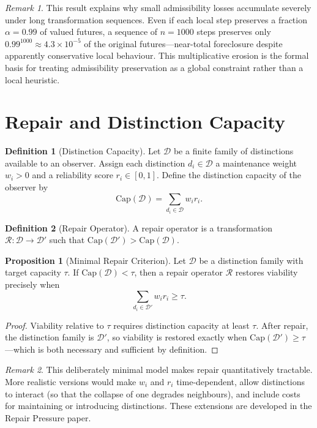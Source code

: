 \documentclass[11pt, oneside]{book}
\theoremstyle{definition}
\newtheorem{definition}{Definition}[chapter]
\newtheorem{proposition}{Proposition}[chapter]
\theoremstyle{remark}
\newtheorem{remark}{Remark}[chapter]
\begin{document}
\begin{remark}
This result explains why small admissibility losses accumulate severely under long transformation sequences. Even if each local step preserves a fraction $\alpha = 0.99$ of valued futures, a sequence of $n = 1000$ steps preserves only $0.99^{1000} \approx 4.3\times 10^{-5}$ of the original futures---near-total foreclosure despite apparently conservative local behaviour. This multiplicative erosion is the formal basis for treating admissibility preservation as a global constraint rather than a local heuristic.
\end{remark}

\section{Repair and Distinction Capacity}

\begin{definition}[Distinction Capacity]
Let $\mathcal{D}$ be a finite family of distinctions available to an observer. Assign each distinction $d_i\in\mathcal{D}$ a maintenance weight $w_i>0$ and a reliability score $r_i\in[0,1]$. Define the distinction capacity of the observer by
\[
\mathrm{Cap}(\mathcal{D}) = \sum_{d_i\in\mathcal{D}} w_i r_i.
\]
\end{definition}

\begin{definition}[Repair Operator]
A repair operator is a transformation $\mathcal{R}:\mathcal{D}\to\mathcal{D}'$ such that $\mathrm{Cap}(\mathcal{D}') > \mathrm{Cap}(\mathcal{D})$.
\end{definition}

\begin{proposition}[Minimal Repair Criterion]
Let $\mathcal{D}$ be a distinction family with target capacity $\tau$. If $\mathrm{Cap}(\mathcal{D})<\tau$, then a repair operator $\mathcal{R}$ restores viability precisely when
\[
\sum_{d_i\in\mathcal{D}'} w_i r_i \geq \tau.
\]
\end{proposition}

\begin{proof}
Viability relative to $\tau$ requires distinction capacity at least $\tau$. After repair, the distinction family is $\mathcal{D}'$, so viability is restored exactly when $\mathrm{Cap}(\mathcal{D}') \geq \tau$---which is both necessary and sufficient by definition.
\end{proof}

\begin{remark}
This deliberately minimal model makes repair quantitatively tractable. More realistic versions would make $w_i$ and $r_i$ time-dependent, allow distinctions to interact (so that the collapse of one degrades neighbours), and include costs for maintaining or introducing distinctions. These extensions are developed in the Repair Pressure paper.
\end{remark}
\end{document}
